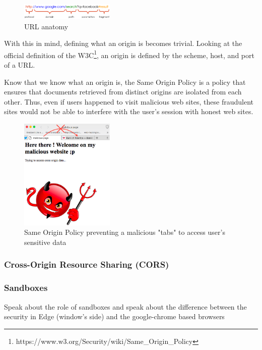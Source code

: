 \documentclass[journal]{IEEEtran}
\begin{document}
\begin{figure}[h]
\centering
\includegraphics[width=0.4\textwidth]{images/URL.png}
\caption{URL anatomy}
\label{fig:URL}
\end{figure}

\medskip

With this in mind, defining what an origin is becomes trivial. Looking at the official definition of the W3C\footnote{https://www.w3.org/Security/wiki/Same\_Origin\_Policy}, an origin is defined by the scheme, host, and port of a URL.

\medskip

Know that we know what an origin is, the Same Origin Policy is a policy that ensures that documents retrieved from distinct origins are isolated from each other. Thus, even if users happened to visit malicious web sites, these fraudulent sites would not be able to interfere with the user's session with honest web sites.

\begin{figure}[h]
\centering
\includegraphics[width=0.4\textwidth]{images/SOPTabs.png}
\caption{Same Origin Policy preventing a malicious "tabs" to access user's sensitive data}
\label{fig:SOPTabs}
\end{figure}

\subsubsection{Cross-Origin Resource Sharing (CORS)}




\subsubsection{Sandboxes}
Speak about the role of sandboxes and speak about the difference between the security in Edge (window's side) and the google-chrome based browsers
\end{document}
